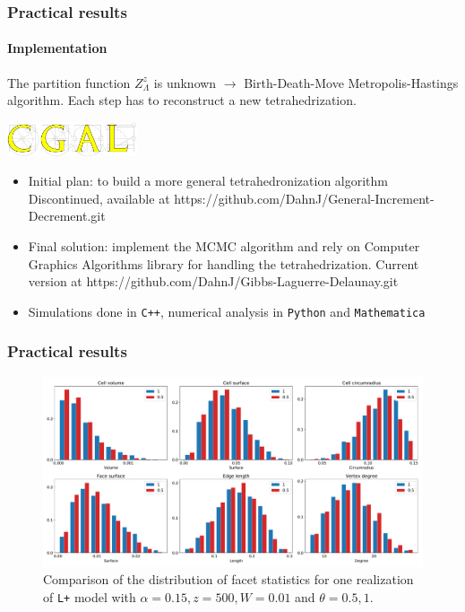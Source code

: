 \documentclass[c, 10pt]{beamer}
\begin{document}
\begin{frame}\frametitle{Practical results}
	\framesubtitle{Implementation}

	The partition function $Z^z_\Lambda$ is unknown $\rightarrow$ Birth-Death-Move Metropolis-Hastings algorithm. \newline
	Each step has to reconstruct a new tetrahedrization.
	
\begin{center}
\includegraphics[height = 1cm]{./FigureLayout/cgal.png}
\end{center}


\begin{itemize}
	\item Initial plan: to build a more general tetrahedronization algorithm \newline
		{\scriptsize Discontinued, available at \alert{https://github.com/DahnJ/General-Increment-Decrement.git}}
	\item Final solution: implement the MCMC algorithm and rely on Computer Graphics Algorithms library for handling the tetrahedrization. \newline
		{\footnotesize Current version at \alert{https://github.com/DahnJ/Gibbs-Laguerre-Delaunay.git}}
	\item Simulations done in \texttt{C++}, numerical analysis in \texttt{Python} and \texttt{Mathematica}
\end{itemize}




\end{frame}






\begin{frame}\frametitle{Practical results}
	
\begin{figure}
  \centering
  \includegraphics[width=1\textwidth]{./FigureLayout/facets_1_05.pdf}
  \caption{Comparison of the distribution of facet statistics for one realization of \texttt{L+} model with $\alpha=0.15,z=500,W=0.01$ and $\theta = 0.5,1$.  }
  \label{fig:thetaeffect}
\end{figure}



\end{frame}
\end{document}
